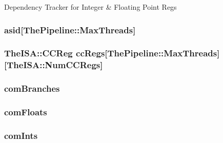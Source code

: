 \label{classInOrderCPU_ab1f63e202ba966be3f297aa2124537a8}
Dependency Tracker for Integer \& Floating Point Regs \hypertarget{classInOrderCPU_a74d3a6e6aba6f28d4cb2e95b45b75f67}{
\subsubsection[{asid}]{ {\bf asid}\mbox{[}{\bf ThePipeline::MaxThreads}\mbox{]}}}
\label{classInOrderCPU_a74d3a6e6aba6f28d4cb2e95b45b75f67}
\hypertarget{classInOrderCPU_ae25728fd5ca9042b3ef3db1d5f39fccc}{
\subsubsection[{ccRegs}]{\setlength{\rightskip}{0pt plus 5cm}TheISA::CCReg {\bf ccRegs}\mbox{[}{\bf ThePipeline::MaxThreads}\mbox{]}\mbox{[}TheISA::NumCCRegs\mbox{]}}}
\label{classInOrderCPU_ae25728fd5ca9042b3ef3db1d5f39fccc}
\hypertarget{classInOrderCPU_afe1814e3fca0fc42be2257c61d7047b3}{
\subsubsection[{comBranches}]{ {\bf comBranches}}}
\label{classInOrderCPU_afe1814e3fca0fc42be2257c61d7047b3}
\hypertarget{classInOrderCPU_a2ac44abc59509ccec79a76bb16812848}{
\subsubsection[{comFloats}]{ {\bf comFloats}}}
\label{classInOrderCPU_a2ac44abc59509ccec79a76bb16812848}
\hypertarget{classInOrderCPU_a0414c26e057889c01ab11e1f0a6cb01b}{
\subsubsection[{comInts}]{ {\bf comInts}}}
\label{classInOrderCPU_a0414c26e057889c01ab11e1f0a6cb01b}
